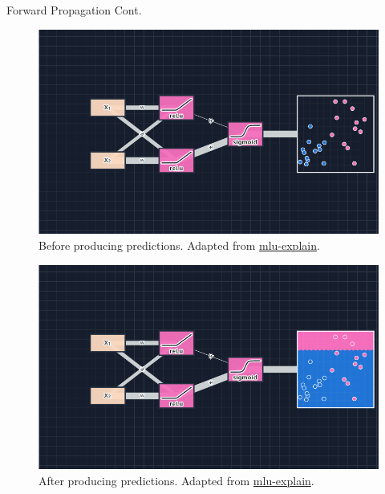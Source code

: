 \documentclass[serif, aspectratio=169]{beamer}
\begin{document}
\begin{frame}{Forward Propagation Cont.}
        \begin{figure}[bh]
            \includegraphics[width=\linewidth]{pic/4/before-forward.png}
            {\scriptsize Before producing predictions. Adapted from \href{https://mlu-explain.github.io/neural-networks/}{mlu-explain}.}
        \end{figure}
    \endminipage
    \hfill
        \begin{figure}[bh]
            \includegraphics[width=\linewidth]{pic/4/after-forward.png}
            {\scriptsize After producing predictions. Adapted from \href{https://mlu-explain.github.io/neural-networks/}{mlu-explain}.}
        \end{figure}
    \endminipage
\end{frame}
\end{document}
